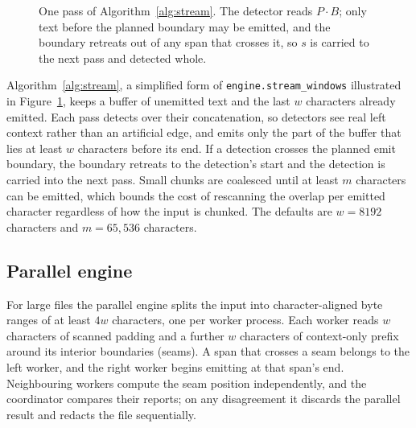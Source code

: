 \documentclass[pdflatex,sn-mathphys-num]{sn-jnl}
\theoremstyle{thmstyleone}
\theoremstyle{thmstylethree}
\begin{document}
\begin{figure}[t]
\centering
{}
\caption{One pass of Algorithm~\ref{alg:stream}. The detector reads $P \cdot B$; only text before the planned boundary may be emitted, and the boundary retreats out of any span that crosses it, so $s$ is carried to the next pass and detected whole.}\label{fig:window}
\end{figure}

Algorithm~\ref{alg:stream}, a simplified form of \texttt{engine.stream\_windows} illustrated in Figure~\ref{fig:window}, keeps a buffer of unemitted text and the last $w$ characters already emitted. Each pass detects over their concatenation, so detectors see real left context rather than an artificial edge, and emits only the part of the buffer that lies at least $w$ characters before its end. If a detection crosses the planned emit boundary, the boundary retreats to the detection's start and the detection is carried into the next pass. Small chunks are coalesced until at least $m$ characters can be emitted, which bounds the cost of rescanning the overlap per emitted character regardless of how the input is chunked. The defaults are $w = 8192$ characters and $m = 65{,}536$ characters.

\subsection{Parallel engine}
For large files the parallel engine splits the input into character-aligned byte ranges of at least $4w$ characters, one per worker process. Each worker reads $w$ characters of scanned padding and a further $w$ characters of context-only prefix around its interior boundaries (seams). A span that crosses a seam belongs to the left worker, and the right worker begins emitting at that span's end. Neighbouring workers compute the seam position independently, and the coordinator compares their reports; on any disagreement it discards the parallel result and redacts the file sequentially.
\end{document}
